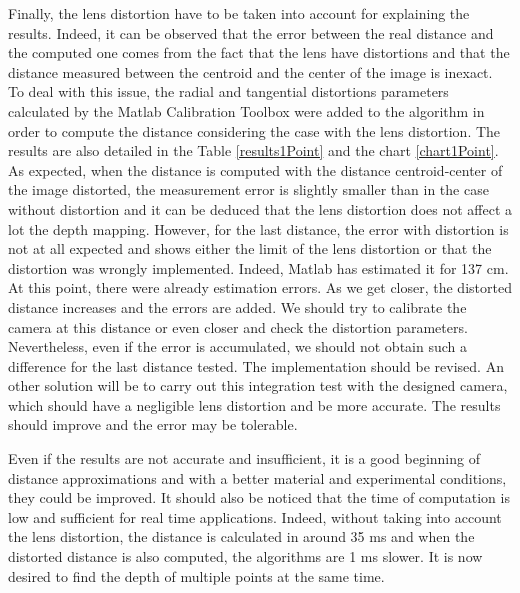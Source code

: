 Finally, the lens distortion have to be taken into account for explaining the results. Indeed, it can be observed that the error between the real distance and the computed one comes from the fact that the lens have distortions and that the distance measured between the centroid and the center of the image is inexact. To deal with this issue, the radial and tangential distortions parameters calculated by the Matlab Calibration Toolbox were added to the algorithm in order to compute the distance considering the case with the lens distortion. The results are also detailed in the Table \ref{results1Point} and the chart \ref{chart1Point}. As expected, when the distance is computed with the distance centroid-center of the image distorted, the measurement error is slightly smaller than in the case without distortion and it can be deduced that the lens distortion does not affect a lot the depth mapping. However, for the last distance, the error with distortion is not at all expected and shows either the limit of the lens distortion or that the distortion was wrongly implemented. Indeed, Matlab has estimated it for 137 cm. At this point, there were already estimation errors. As we get closer, the distorted distance increases and the errors are added. We should try to calibrate the camera at this distance or even closer and check the distortion parameters. Nevertheless, even if the error is accumulated, we should not obtain such a difference for the last distance tested. The implementation should be revised. An other solution will be to carry out this integration test with the designed camera, which should have a negligible lens distortion and be more accurate. The results should improve and the error may be tolerable.

Even if the results are not accurate and insufficient, it is a good beginning of distance approximations and with a better material and experimental conditions, they could be improved. It should also be noticed that the time of computation is low and sufficient for real time applications. Indeed, without taking into account the lens distortion, the distance is calculated in around 35 ms and when the distorted distance is also computed, the algorithms are 1 ms slower. It is now desired to find the depth of multiple points at the same time.